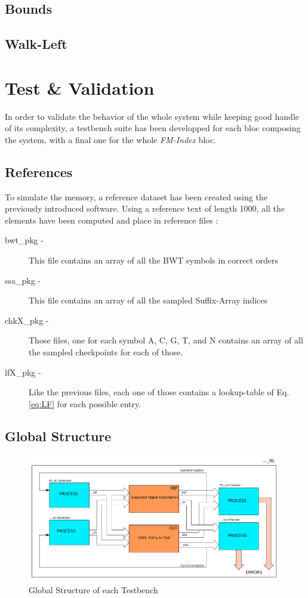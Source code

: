\subsection{Bounds}

\subsection{Walk-Left}



\section{Test \& Validation}

In order to validate the behavior of the whole system while keeping good handle of its complexity, a testbench suite has been developped for each bloc composing the system, with a final one for the whole \textsl{FM-Index} bloc. \\

\subsection{References}
To simulate the memory, a reference dataset has been created using the previously introduced software. Using a reference text of length 1000, all the elements have been computed and place in reference files :

\begin{description}
\item [bwt\_pkg -] This file contains an array of all the BWT symbols in correct orders
\item [ssa\_pkg -] This file contains an array of all the sampled Suffix-Array indices
\item [chkX\_pkg -] Those files, one for each symbol A, C, G, T, and N contains an array of all the sampled checkpoints for each of those.
\item [lfX\_pkg -] Like the previous files, each one of those contains a lookup-table of Eq. \ref{eq:LF} for each possible entry.
\end{description}

\subsection{Global Structure}

\begin{figure}[H]
 \includegraphics[scale = 0.4]{Figures/TB_struct.png}
    \caption{Global Structure of each Testbench}
    \label{fig:Tb_struct}
\end{figure}

